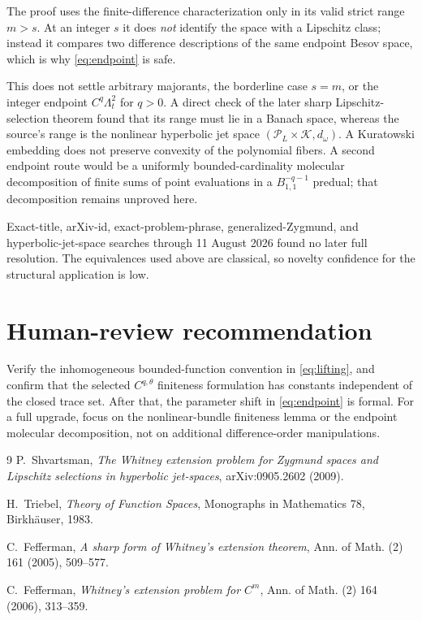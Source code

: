 \documentclass[11pt]{article}
\begin{document}
The proof uses the finite-difference characterization only in its valid
strict range $m>s$.  At an integer $s$ it does \emph{not} identify the space
with a Lipschitz class; instead it compares two difference descriptions of
the same endpoint Besov space, which is why \eqref{eq:endpoint} is safe.

This does not settle arbitrary majorants, the borderline case $s=m$, or the
integer endpoint $C^q\Lambda_t^2$ for $q>0$.  A direct check of the later sharp
Lipschitz-selection theorem found that its range must lie in a Banach space,
whereas the source's range is the nonlinear hyperbolic jet space
$(\mathcal P_L\times\mathcal K,d_\omega)$.  A Kuratowski embedding does not
preserve convexity of the polynomial fibers.  A second endpoint route would
be a uniformly bounded-cardinality molecular decomposition of finite sums of
point evaluations in a $B^{-q-1}_{1,1}$ predual; that decomposition remains
unproved here.

Exact-title, arXiv-id, exact-problem-phrase, generalized-Zygmund, and
hyperbolic-jet-space searches through 11 August 2026 found no later full
resolution.  The equivalences used above are classical, so novelty confidence
for the structural application is low.

\section*{Human-review recommendation}

Verify the inhomogeneous bounded-function convention in
\eqref{eq:lifting}, and confirm that the selected $C^{q,\theta}$ finiteness
formulation has constants independent of the closed trace set.  After that,
the parameter shift in \eqref{eq:endpoint} is formal.  For a full upgrade,
focus on the nonlinear-bundle finiteness lemma or the endpoint molecular
decomposition, not on additional difference-order manipulations.

\begin{thebibliography}{9}
P.~Shvartsman,
\emph{The Whitney extension problem for Zygmund spaces and Lipschitz
selections in hyperbolic jet-spaces}, arXiv:0905.2602 (2009).

H.~Triebel,
\emph{Theory of Function Spaces}, Monographs in Mathematics 78,
Birkh\"auser, 1983.

C.~Fefferman,
\emph{A sharp form of Whitney's extension theorem},
Ann. of Math. (2) 161 (2005), 509--577.

C.~Fefferman,
\emph{Whitney's extension problem for $C^m$},
Ann. of Math. (2) 164 (2006), 313--359.
\end{thebibliography}
\end{document}
